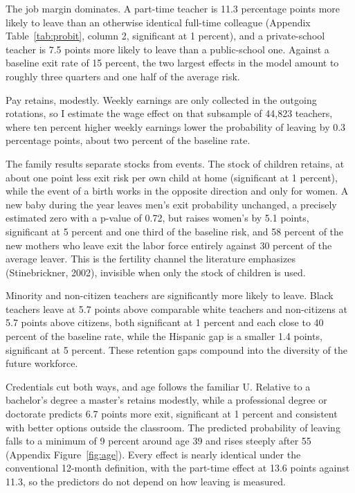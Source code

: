 \documentclass[11pt,a4paper]{article}
\begin{document}
The job margin dominates. A part-time teacher is 11.3 percentage points
more likely to leave than an otherwise identical full-time colleague
(Appendix Table~\ref{tab:probit}, column 2, significant at 1 percent), and
a private-school teacher is 7.5 points more likely to leave than a
public-school one. Against a baseline exit rate of 15 percent, the two
largest effects in the model amount to roughly three quarters and one half
of the average risk.

Pay retains, modestly. Weekly earnings are only collected in the outgoing
rotations, so I estimate the wage effect on that subsample of 44{,}823
teachers, where ten percent higher weekly earnings lower the probability
of leaving by 0.3 percentage points, about two percent of the baseline
rate.

The family results separate stocks from events. The stock of children
retains, at about one point less exit risk per own child at home
(significant at 1 percent), while the event of a birth works in the
opposite direction and only for women. A new baby during the year leaves
men's exit probability unchanged, a precisely estimated zero with a
p-value of 0.72, but raises women's by 5.1 points, significant at 5
percent and one third of the baseline risk, and 58 percent of the new
mothers who leave exit the labor force entirely against 30 percent of the
average leaver. This is the fertility channel the literature emphasizes
(Stinebrickner, 2002), invisible when only the stock of children is used.

Minority and non-citizen teachers are significantly more likely to leave.
Black teachers leave at 5.7 points above comparable white teachers and
non-citizens at 5.7 points above citizens, both significant at 1 percent
and each close to 40 percent of the baseline rate, while the Hispanic gap
is a smaller 1.4 points, significant at 5 percent. These retention gaps
compound into the diversity of the future workforce.

Credentials cut both ways, and age follows the familiar U. Relative to a
bachelor's degree a master's retains modestly, while a professional degree
or doctorate predicts 6.7 points more exit, significant at 1 percent and
consistent with better options outside the classroom. The predicted
probability of leaving falls to a minimum of 9 percent around age 39 and
rises steeply after 55 (Appendix Figure~\ref{fig:age}). Every effect is
nearly identical under the conventional 12-month definition, with the
part-time effect at 13.6 points against 11.3, so the predictors do not
depend on how leaving is measured.
\end{document}
